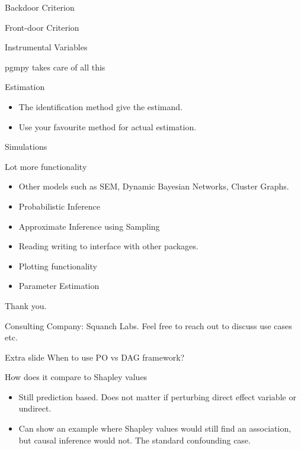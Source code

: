 \documentclass{beamer}
\begin{document}
\begin{frame}{Backdoor Criterion}
\end{frame}

\begin{frame}{Front-door Criterion}
\end{frame}

\begin{frame}{Instrumental Variables}
\end{frame}

\begin{frame}{pgmpy takes care of all this}
\end{frame}

\begin{frame}{Estimation}
	\begin{itemize}
		\item The identification method give the estimand.
		\item Use your favourite method for actual estimation.
	\end{itemize}
\end{frame}

\begin{frame}{Simulations}
\end{frame}

\begin{frame}{Lot more functionality}
	\begin{itemize}
		\item Other models such as SEM, Dynamic Bayesian Networks, Cluster Graphs.
		\item Probabilistic Inference
		\item Approximate Inference using Sampling
		\item Reading writing to interface with other packages.
		\item Plotting functionality
		\item Parameter Estimation
	\end{itemize}
\end{frame}

\begin{frame}
	Thank you.

	Consulting Company: Squanch Labs. Feel free to reach out to discuss use cases etc.
\end{frame}

\begin{frame}{Extra slide}
	When to use PO vs DAG framework?
\end{frame}

\begin{frame}
	How does it compare to Shapley values 
	\begin{itemize}
		\item Still prediction based. Does not matter if perturbing direct effect variable or undirect.
		\item Can show an example where Shapley values would still find an association, but causal inference would not. The standard confounding case.
	\end{itemize}
\end{frame}
\end{document}
